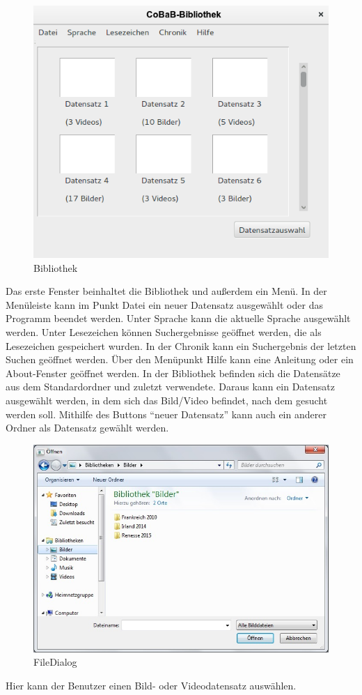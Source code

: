 \begin{figure}[H]
\includegraphics[width=1\linewidth]{img/Bibliothek2}
\caption{Bibliothek}
\label{fig:bibliothek}
\end{figure}
Das erste Fenster beinhaltet die Bibliothek und außerdem ein Menü. In der Menüleiste kann im Punkt Datei ein neuer Datensatz ausgewählt oder das Programm beendet werden.  Unter Sprache kann die aktuelle Sprache ausgewählt werden. Unter Lesezeichen können Suchergebnisse geöffnet werden, die als Lesezeichen gespeichert wurden. In der Chronik kann ein Suchergebnis der letzten Suchen geöffnet werden. Über den Menüpunkt Hilfe kann eine Anleitung oder ein About-Fenster geöffnet werden.
In der Bibliothek befinden sich die Datensätze aus dem Standardordner und zuletzt verwendete. Daraus kann ein Datensatz ausgewählt werden, in dem sich das Bild/Video befindet, nach dem gesucht werden soll. Mithilfe des Buttons \enquote{neuer Datensatz} kann auch ein anderer Ordner als Datensatz gewählt werden.

\begin{figure}[H]
\includegraphics[width=1\linewidth]{img/FileChooser}
\caption{FileDialog}
\label{fig:filedialog}
\end{figure}
Hier kann der Benutzer einen Bild- oder Videodatensatz auswählen.


